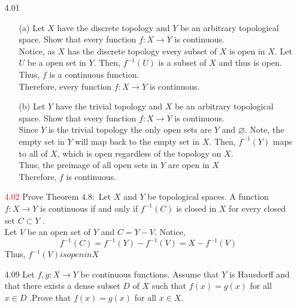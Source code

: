 \documentclass[12pt]{article}
\begin{document}
\pagestyle{fancy}  
\lfoot{} \cfoot{} \rfoot{}

\begin{enumerate}

	\item[4.01] 
	\begin{enumerate}
	
	\item[(a)] Let $X$ have the discrete topology and $Y$ be an arbitrary topological space.
	Show that every function $f : X \rightarrow Y$ is continuous.\\
	Notice, as $ X $ has the discrete topology every subset of $ X $ is open in $ X $. Let $ U $ be a open set in $ Y $. Then, $ f^{-1}(U) $ is a subset of $ X $ and thus is open. \\
	Thus, $ f $ is a continuous function. \\
	Therefore, every function $f : X \rightarrow Y$ is continuous.
	\item[(b)]Let $Y$ have the trivial topology and $X$ be an arbitrary topological space.
	Show that every function $f : X \rightarrow Y$ is continuous.\\
	Since $ Y $ is the trivial topology the only open sets are $ Y $ and $ \varnothing $. Note, the empty set in $ Y $ will map back to the empty set in $ X $. Then, $ f^{-1}(Y) $ maps to all of $ X $, which is open regardless of the topology on $ X $.\\
	Thus, the preimage of all open sets in $ Y $ are open in $ X $\\
	Therefore, $ f $ is continuous.
	
	\end{enumerate}
	\item[\textcolor{red}{4.02}] Prove Theorem $4.8 :$ Let $X$ and $Y$ be topological spaces. A function $f : X \rightarrow Y$ is continuous if and only if $f ^ { - 1 } ( C )$ is closed in $X$ for every closed set $C \subset Y$ .\\
	Let $ V $ be an open set of $ Y $ and $ C = Y-V $. Notice,
		\[f^{-1}(C)=f^{-1}(Y)-f^{-1}(V)=X-f^{-1}(V)\]
	Thus, $ f^{-1}(V) is open in X$
	
	\item[4.09] Let $f , g : X \rightarrow Y$ be continuous functions. Assume that $Y$ is Hausdorff and that there exists a dense subset $D$ of $X$ such that $f ( x ) = g ( x )$ for all $x \in D$ .Prove that $f ( x ) = g ( x )$ for all $x \in X .$\\
	

\end{enumerate}
\end{document}
